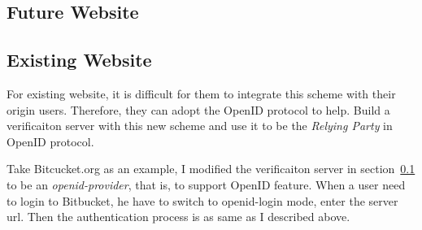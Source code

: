 \begin{CJK}{Bg5}{bsmi}
\subsection{Future Website}
\label{sec:future-website}

\subsection{Existing Website}

For existing website, it is difficult for them to integrate this scheme with their origin users. Therefore, they can adopt the OpenID protocol to help. Build a verificaiton server with this new scheme and use it to be the \emph{Relying Party} in OpenID protocol.

Take Bitcucket.org as an example, I modified the verificaiton server in section~\ref{sec:future-website} to be an \emph{openid-provider}, that is, to support OpenID feature. When a user need to login to Bitbucket, he have to switch to openid-login mode, enter the server url. Then the authentication process is as same as I described above. 

\end{CJK}